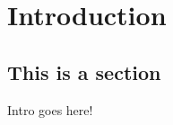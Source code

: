 \chapter{Introduction}
\label{cha:Intro}

\section{This is a section}
\label{sec:section1}
Intro goes here!